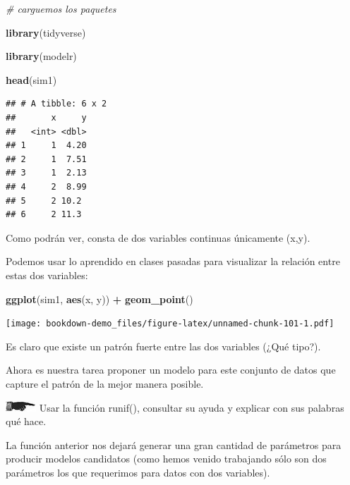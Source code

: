 \documentclass[]{book}
\newenvironment{Shaded}{\begin{snugshade}}{\end{snugshade}}
\newcommand{\KeywordTok}[1]{\textcolor[rgb]{0.13,0.29,0.53}{\textbf{#1}}}
\newcommand{\StringTok}[1]{\textcolor[rgb]{0.31,0.60,0.02}{#1}}
\newcommand{\CommentTok}[1]{\textcolor[rgb]{0.56,0.35,0.01}{\textit{#1}}}
\newcommand{\OperatorTok}[1]{\textcolor[rgb]{0.81,0.36,0.00}{\textbf{#1}}}
\newcommand{\NormalTok}[1]{#1}
\theoremstyle{definition}
\theoremstyle{definition}
\theoremstyle{definition}
\theoremstyle{remark}
\begin{document}
\begin{Shaded}
\begin{Highlighting}[]
\CommentTok{# carguemos los paquetes}

\KeywordTok{library}\NormalTok{(tidyverse)}

\KeywordTok{library}\NormalTok{(modelr)}

\KeywordTok{head}\NormalTok{(sim1)}
\end{Highlighting}
\end{Shaded}

\begin{verbatim}
## # A tibble: 6 x 2
##       x     y
##   <int> <dbl>
## 1     1  4.20
## 2     1  7.51
## 3     1  2.13
## 4     2  8.99
## 5     2 10.2 
## 6     2 11.3
\end{verbatim}

Como podrán ver, consta de dos variables continuas únicamente (x,y).

Podemos usar lo aprendido en clases pasadas para visualizar la relación
entre estas dos variables:

\begin{Shaded}
\begin{Highlighting}[]
\KeywordTok{ggplot}\NormalTok{(sim1, }\KeywordTok{aes}\NormalTok{(x, y)) }\OperatorTok{+}\StringTok{ }
\StringTok{  }\KeywordTok{geom_point}\NormalTok{()}
\end{Highlighting}
\end{Shaded}

\texttt{[image: bookdown-demo\_files/figure-latex/unnamed-chunk-101-1.pdf]}

Es claro que existe un patrón fuerte entre las dos variables (¿Qué
tipo?).

Ahora es nuestra tarea proponer un modelo para este conjunto de datos
que capture el patrón de la mejor manera posible.

\includegraphics{./imagenes/manicule2.jpg} Usar la función runif(),
consultar su ayuda y explicar con sus palabras qué hace.

La función anterior nos dejará generar una gran cantidad de parámetros
para producir modelos candidatos (como hemos venido trabajando sólo son
dos parámetros los que requerimos para datos con dos variables).
\end{document}
